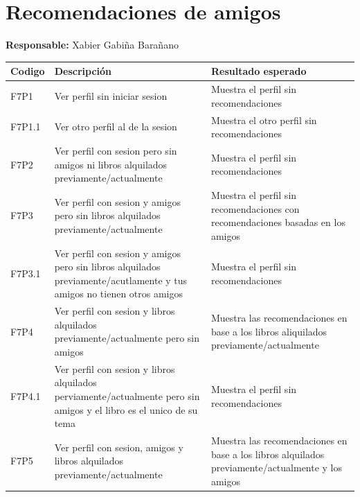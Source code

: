 ﻿\documentclass{report}
\begin{document}
        \section{Recomendaciones de amigos}
            \begin{center}
                \textbf{Responsable:} Xabier Gabiña Barañano\\
                \begin{longtable}{|m{2cm}|m{4cm}|m{4cm}|}
                    \hline
                    Codigo & Descripción & Resultado esperado \\
                    \hline
                    \endhead
                    \hline
                    F7P1 & Ver perfil sin iniciar sesion & Muestra el perfil sin recomendaciones \\
                    \hline
                    F7P1.1 & Ver otro perfil al de la sesion & Muestra el otro perfil sin recomendaciones \\
                    \hline
                    F7P2 & Ver perfil con sesion pero sin amigos ni libros alquilados previamente/actualmente & Muestra el perfil sin recomendaciones \\
                    \hline
                    F7P3 & Ver perfil con sesion y amigos pero sin libros alquilados previamente/actualmente & Muestra el perfil sin recomendaciones con recomendaciones basadas en los amigos \\
                    \hline
                    F7P3.1 & Ver perfil con sesion y amigos pero sin libros alquilados previamente/acutlamente y tus amigos no tienen otros amigos & Muestra el perfil sin recomendaciones \\
                    \hline
                    F7P4 & Ver perfil con sesion y libros alquilados previamente/actualmente pero sin amigos & Muestra las recomendaciones en base a los libros aliquilados previamente/actualmente \\
                    \hline
                    F7P4.1 & Ver perfil con sesion y libros alquilados perviamente/actualmente pero sin amigos y el libro es el unico de su tema & Muestra el perfil sin recomendaciones \\
                    \hline
                    F7P5 & Ver perfil con sesion, amigos y libros alquilados previamente/actualmente & Muestra las recomendaciones en base a los libros alquilados previamente/actualmente y los amigos \\
                    \hline
                \end{longtable}
            \end{center}
            \clearpage
\end{document}
